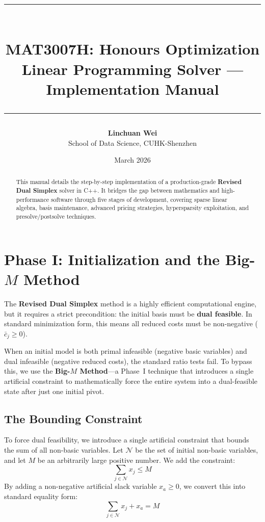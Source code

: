 \documentclass[11pt, a4paper]{article}
\title{%
  {\color{PrimaryBlue}\rule{\linewidth}{2pt}}\\[6pt]
  {\LARGE\bfseries\color{PrimaryBlue} MAT3007H: Honours Optimization}\\[4pt]
  {\large\color{AccentTeal} Linear Programming Solver --- Implementation Manual}\\[4pt]
  {\color{PrimaryBlue}\rule{\linewidth}{2pt}}
}
\author{\textbf{Linchuan Wei}\\[2pt]
        {\small School of Data Science, CUHK-Shenzhen}}
\date{March 2026}
\begin{document}

\maketitle

\begin{abstract}
\noindent
This manual details the step-by-step implementation of a production-grade
\textbf{Revised Dual Simplex} solver in C++. It bridges the gap between
mathematics and high-performance software through five stages of development,
covering sparse linear algebra, basis maintenance, advanced pricing strategies,
hypersparsity exploitation, and presolve/postsolve techniques.
\end{abstract}

\tableofcontents
\newpage
\section{Phase I: Initialization and the Big-\texorpdfstring{$M$}{M} Method}

The \textbf{Revised Dual Simplex} method is a highly efficient computational engine, but it requires a strict precondition: the initial basis must be \textbf{dual feasible}. In standard minimization form, this means all reduced costs must be non-negative ($\bar{c}_j \ge 0$). 

When an initial model is both primal infeasible (negative basic variables) and dual infeasible (negative reduced costs), the standard ratio tests fail. To bypass this, we use the \textbf{Big-$M$ Method}---a Phase~I technique that introduces a single artificial constraint to mathematically force the entire system into a dual-feasible state after just one initial pivot.

\subsection{The Bounding Constraint}

\begin{definition}
To force dual feasibility, we introduce a single artificial constraint that bounds the sum of all non-basic variables. Let $\mathcal{N}$ be the set of initial non-basic variables, and let $M$ be an arbitrarily large positive number. We add the constraint:
\[
\sum_{j \in \mathcal{N}} x_j \le M
\]
By adding a non-negative artificial slack variable $x_a \ge 0$, we convert this into standard equality form:
\[
\sum_{j \in \mathcal{N}} x_j + x_a = M
\]
\end{definition}
\end{document}
